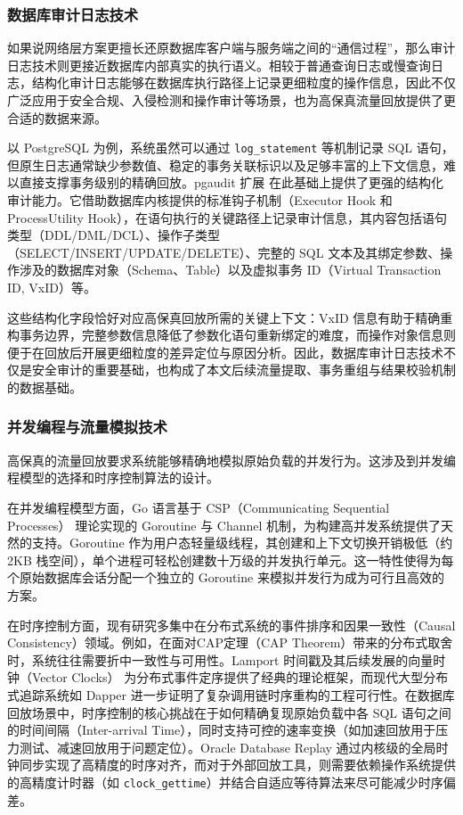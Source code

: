 \subsubsection{数据库审计日志技术}

如果说网络层方案更擅长还原数据库客户端与服务端之间的“通信过程”，那么审计日志技术则更接近数据库内部真实的执行语义。相较于普通查询日志或慢查询日志，结构化审计日志能够在数据库执行路径上记录更细粒度的操作信息，因此不仅广泛应用于安全合规、入侵检测和操作审计等场景\cite{MySQLAudit,SQLServerAudit}，也为高保真流量回放提供了更合适的数据来源。

以 PostgreSQL 为例，系统虽然可以通过 \texttt{log\_statement} 等机制记录 SQL 语句，但原生日志通常缺少参数值、稳定的事务关联标识以及足够丰富的上下文信息，难以直接支撑事务级别的精确回放。pgaudit 扩展\cite{pgaudit} 在此基础上提供了更强的结构化审计能力。它借助数据库内核提供的标准钩子机制（Executor Hook 和 ProcessUtility Hook），在语句执行的关键路径上记录审计信息，其内容包括语句类型（DDL/DML/DCL）、操作子类型（SELECT/INSERT/UPDATE/DELETE）、完整的 SQL 文本及其绑定参数、操作涉及的数据库对象（Schema、Table）以及虚拟事务 ID（Virtual Transaction ID, VxID）等。

这些结构化字段恰好对应高保真回放所需的关键上下文：VxID 信息有助于精确重构事务边界，完整参数信息降低了参数化语句重新绑定的难度，而操作对象信息则便于在回放后开展更细粒度的差异定位与原因分析。因此，数据库审计日志技术不仅是安全审计的重要基础，也构成了本文后续流量提取、事务重组与结果校验机制的数据基础。

\subsubsection{并发编程与流量模拟技术}

高保真的流量回放要求系统能够精确地模拟原始负载的并发行为。这涉及到并发编程模型的选择和时序控制算法的设计。

在并发编程模型方面，Go 语言基于 CSP（Communicating Sequential Processes）\cite{CSP} 理论实现的 Goroutine 与 Channel 机制，为构建高并发系统提供了天然的支持。Goroutine 作为用户态轻量级线程，其创建和上下文切换开销极低（约 2KB 栈空间），单个进程可轻松创建数十万级的并发执行单元\cite{GoConcurrencyPatterns}。这一特性使得为每个原始数据库会话分配一个独立的 Goroutine 来模拟并发行为成为可行且高效的方案。

在时序控制方面，现有研究多集中在分布式系统的事件排序和因果一致性（Causal Consistency）领域。例如，在面对CAP定理（CAP Theorem）\cite{CAP}带来的分布式取舍时，系统往往需要折中一致性与可用性。Lamport 时间戳\cite{LamportClock}及其后续发展的向量时钟（Vector Clocks）\cite{VectorClock} 为分布式事件定序提供了经典的理论框架，而现代大型分布式追踪系统如 Dapper\cite{Dapper} 进一步证明了复杂调用链时序重构的工程可行性。在数据库回放场景中，时序控制的核心挑战在于如何精确复现原始负载中各 SQL 语句之间的时间间隔（Inter-arrival Time），同时支持可控的速率变换（如加速回放用于压力测试、减速回放用于问题定位）。Oracle Database Replay 通过内核级的全局时钟同步实现了高精度的时序对齐，而对于外部回放工具，则需要依赖操作系统提供的高精度计时器（如 \texttt{clock\_gettime}）并结合自适应等待算法来尽可能减少时序偏差。


